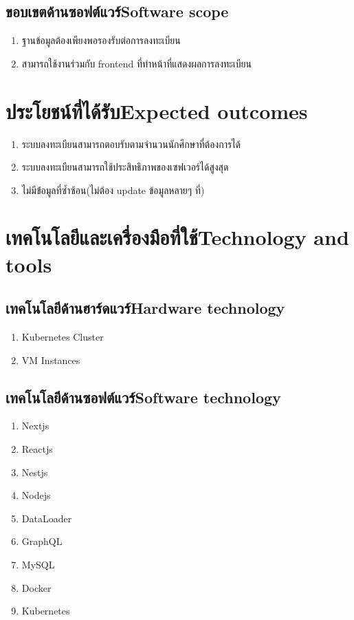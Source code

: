 \subsection{\ifcpe ขอบเขตด้านซอฟต์แวร์\else Software scope\fi}
\begin{enumerate}
    \item ฐานข้อมูลต้องเพียงพอรองรับต่อการลงทะเบียน
    \item สามารถใช้งานร่วมกับ frontend ที่ทำหน้าที่แสดงผลการลงทะเบียน
\end{enumerate}
\section{\ifcpe ประโยชน์ที่ได้รับ\else Expected outcomes\fi}
\begin{enumerate}
    \item ระบบลงทะเบียนสามารถตอบรับตามจำนวนนักศึกษาที่ต้องการได้
    \item ระบบลงทะเบียนสามารถใช้ประสิทธิภาพของเซฟเวอร์ได้สูงสุด
    \item ไม่มีข่้อมูลที่ซ้ำซ้อน(ไม่ต้อง update ข้อมูลหลายๆ ที่)
\end{enumerate}

\section{\ifcpe เทคโนโลยีและเครื่องมือที่ใช้\else Technology and tools\fi}

\subsection{\ifcpe เทคโนโลยีด้านฮาร์ดแวร์\else Hardware technology\fi}
\begin{enumerate}
    \item Kubernetes Cluster
    \item VM Instances
\end{enumerate}

\subsection{\ifcpe เทคโนโลยีด้านซอฟต์แวร์\else Software technology\fi}
\begin{enumerate}
    \item Nextjs \cite{nextjs}
    \item Reactjs \cite{reactjs}
    \item Nestjs \cite {nestjs}
    \item Nodejs \cite {nodejs}
    \item DataLoader \cite {dataloader}
    \item GraphQL \cite {graphql}
    \item MySQL \cite {mysql}
    \item Docker \cite {docker}
    \item Kubernetes \cite {kubernetes}
\end{enumerate}

